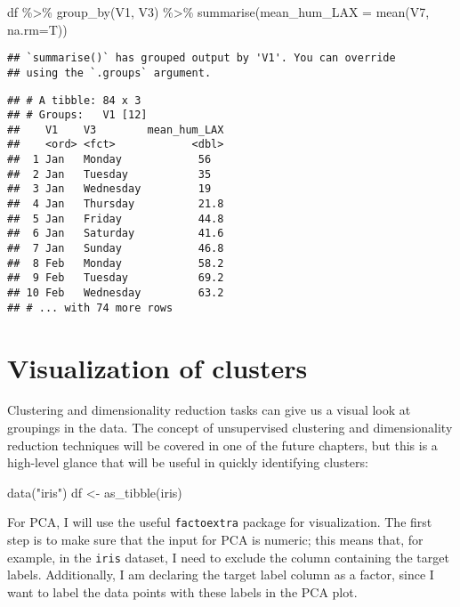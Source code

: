 \documentclass[
]{book}
\newenvironment{Shaded}{\begin{snugshade}}{\end{snugshade}}
\newcommand{\AttributeTok}[1]{\textcolor[rgb]{0.77,0.63,0.00}{#1}}
\newcommand{\FunctionTok}[1]{\textcolor[rgb]{0.00,0.00,0.00}{#1}}
\newcommand{\NormalTok}[1]{#1}
\newcommand{\OtherTok}[1]{\textcolor[rgb]{0.56,0.35,0.01}{#1}}
\newcommand{\SpecialCharTok}[1]{\textcolor[rgb]{0.00,0.00,0.00}{#1}}
\newcommand{\StringTok}[1]{\textcolor[rgb]{0.31,0.60,0.02}{#1}}
\begin{document}
\begin{Shaded}
\begin{Highlighting}[]
\NormalTok{df }\SpecialCharTok{\%\textgreater{}\%} \FunctionTok{group\_by}\NormalTok{(V1, V3) }\SpecialCharTok{\%\textgreater{}\%}
  \FunctionTok{summarise}\NormalTok{(}\AttributeTok{mean\_hum\_LAX =} \FunctionTok{mean}\NormalTok{(V7, }\AttributeTok{na.rm=}\NormalTok{T))}
\end{Highlighting}
\end{Shaded}

\begin{verbatim}
## `summarise()` has grouped output by 'V1'. You can override
## using the `.groups` argument.
\end{verbatim}

\begin{verbatim}
## # A tibble: 84 x 3
## # Groups:   V1 [12]
##    V1    V3        mean_hum_LAX
##    <ord> <fct>            <dbl>
##  1 Jan   Monday            56  
##  2 Jan   Tuesday           35  
##  3 Jan   Wednesday         19  
##  4 Jan   Thursday          21.8
##  5 Jan   Friday            44.8
##  6 Jan   Saturday          41.6
##  7 Jan   Sunday            46.8
##  8 Feb   Monday            58.2
##  9 Feb   Tuesday           69.2
## 10 Feb   Wednesday         63.2
## # ... with 74 more rows
\end{verbatim}

\hypertarget{visualization-of-clusters}{%
\section{Visualization of clusters}\label{visualization-of-clusters}}

Clustering and dimensionality reduction tasks can give us a visual look at groupings in the data. The concept of unsupervised clustering and dimensionality reduction techniques will be covered in one of the future chapters, but this is a high-level glance that will be useful in quickly identifying clusters:

\begin{Shaded}
\begin{Highlighting}[]
\FunctionTok{data}\NormalTok{(}\StringTok{"iris"}\NormalTok{)}
\NormalTok{df }\OtherTok{\textless{}{-}} \FunctionTok{as\_tibble}\NormalTok{(iris)}
\end{Highlighting}
\end{Shaded}

For PCA, I will use the useful \texttt{factoextra} package for visualization. The first step is to make sure that the input for PCA is numeric; this means that, for example, in the \texttt{iris} dataset, I need to exclude the column containing the target labels. Additionally, I am declaring the target label column as a factor, since I want to label the data points with these labels in the PCA plot.
\end{document}
